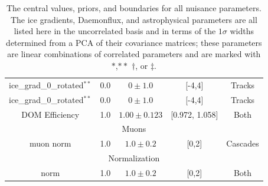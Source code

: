 \documentclass[main.tex]{subfiles}
\begin{document}
\begin{table}
\begin{tabular}{c | cccc}
        ice\_grad\_0\_rotated$^{**}$ & 0.0 & $0\pm 1.0$ & [-4,4] & Tracks\\
        ice\_grad\_0\_rotated$^{**}$ & 0.0 & $0\pm 1.0$ & [-4,4]& Tracks \\
        DOM Efficiency & 1.0 & $1.00\pm0.123$ & [0.972, 1.058] & Both \\
        \multicolumn{5}{c}{Muons} \\\hline
        muon norm & 1.0 & $1.0\pm0.2$ & [0,2] & Cascades\\
        \multicolumn{5}{c}{Normalization} \\\hline
        norm & 1.0 & $1.0\pm0.2$ & [0,2] & Both
    \end{tabular}
    \caption{The central values, priors, and boundaries for all nuisance parameters. The ice gradients, Daemonflux, and astrophysical parameters are all listed here in the uncorrelated basis and in terms of the $1\sigma$ widths determined from a PCA of their covariance matrices; these parameters are linear combinations of correlated parameters and are marked with $*$,$**$ $\dag$, or $\ddag$.}\label{table:nutrition}
\end{table}
\end{document}
